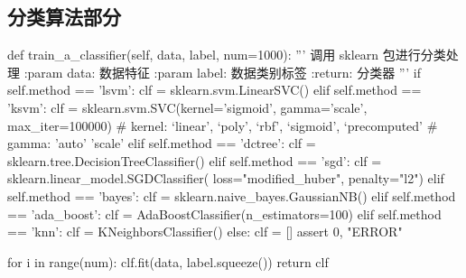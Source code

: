 \subsection{分类算法部分}
\begin{python}

def train_a_classifier(self, data, label, num=1000):
        '''
        调用 sklearn 包进行分类处理
        :param data: 数据特征
        :param label: 数据类别标签
        :return: 分类器
        '''
        if self.method == 'lsvm':
            clf = sklearn.svm.LinearSVC()
        elif self.method == 'ksvm':
            clf = sklearn.svm.SVC(kernel='sigmoid', gamma='scale', max_iter=100000)
            # kernel: ‘linear’, ‘poly’, ‘rbf’, ‘sigmoid’, ‘precomputed’
            # gamma: 'auto' 'scale'
        elif self.method == 'dctree':
            clf = sklearn.tree.DecisionTreeClassifier()
        elif self.method == 'sgd':
            clf = sklearn.linear_model.SGDClassifier(
                loss="modified_huber", penalty="l2")
        elif self.method == 'bayes':
            clf = sklearn.naive_bayes.GaussianNB()
        elif self.method == 'ada_boost':
            clf = AdaBoostClassifier(n_estimators=100)
        elif self.method == 'knn':
            clf = KNeighborsClassifier()
        else:
            clf = []
            assert 0, "ERROR"

        for i in range(num):
            clf.fit(data, label.squeeze())
        return clf
        
\end{python}


